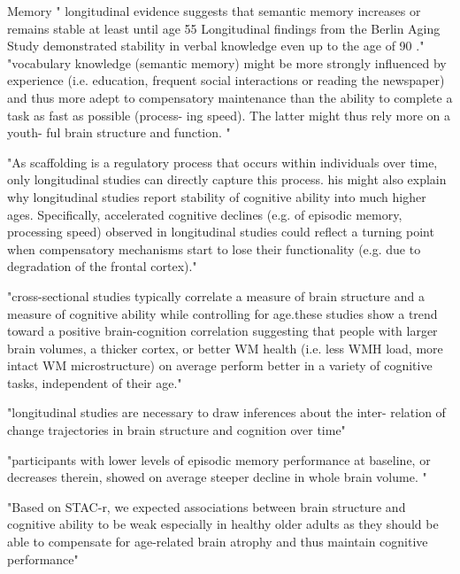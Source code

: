 \documentclass[twoside,onecolumn]{article}
\begin{document}
Memory
" longitudinal evidence suggests that semantic memory increases or remains stable at least until age 55 \cite{ronnlund2005stability}
Longitudinal findings from the Berlin Aging Study demonstrated stability in verbal knowledge even up to the age of 90 \cite{park2002models}."
"vocabulary knowledge (semantic memory) might be more strongly influenced by experience (i.e. education, frequent social interactions or reading the newspaper) and thus more adept to compensatory maintenance than the ability to complete a task as fast as possible (process- ing speed). The latter might thus rely more on a youth- ful brain structure and function. "

"As scaffolding is a regulatory process that occurs within individuals over time, only longitudinal studies can directly capture this process. his might also explain why longitudinal studies report stability of cognitive ability into much higher ages. Specifically, accelerated cognitive declines (e.g. of episodic memory, processing speed) observed in longitudinal studies could reflect a turning point when compensatory mechanisms start to lose their functionality (e.g. due to degradation of the frontal cortex)."


"cross-sectional studies typically correlate a measure of brain structure and a measure of cognitive ability while controlling for age.these studies show a trend toward a positive brain-cognition correlation suggesting that people with larger brain volumes, a thicker cortex, or better WM health (i.e. less WMH load, more intact WM microstructure) on average perform better in a variety of cognitive tasks, independent of their age."

"longitudinal studies are necessary to draw inferences about the inter- relation of change trajectories in brain structure and cognition over time"

"participants with lower levels of episodic memory performance at baseline, or decreases therein, showed on average steeper decline in whole brain volume. "

"Based on STAC-r, we expected associations between brain structure and cognitive ability to be weak especially in healthy older adults as they should be able to compensate for age-related brain atrophy and thus maintain cognitive performance"


\end{document}
